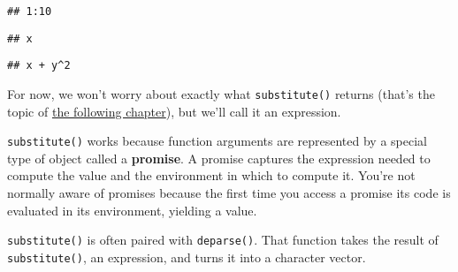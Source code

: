\begin{Shaded}
\begin{Highlighting}[]
\StringTok{ }
\NormalTok{\}}
\NormalTok{(}\OperatorTok{:}\NormalTok{)}
\end{Highlighting}
\end{Shaded}

\begin{verbatim}
## 1:10
\end{verbatim}

\begin{Shaded}
\begin{Highlighting}[]
\StringTok{ }
\end{Highlighting}
\end{Shaded}

\begin{verbatim}
## x
\end{verbatim}

\begin{Shaded}
\begin{Highlighting}[]
\StringTok{ }
\OperatorTok{+}\StringTok{ }\OperatorTok{^}\NormalTok{)}
\end{Highlighting}
\end{Shaded}

\begin{verbatim}
## x + y^2
\end{verbatim}

For now, we won't worry about exactly what \texttt{substitute()} returns
(that's the topic of \protect\hyperlink{metaprogramming}{the following
chapter}), but we'll call it an expression.

\texttt{substitute()} works because function arguments are represented
by a special type of object called a \textbf{promise}. A promise
captures the expression needed to compute the value and the environment
in which to compute it. You're not normally aware of promises because
the first time you access a promise its code is evaluated in its
environment, yielding a value. 

\texttt{substitute()} is often paired with \texttt{deparse()}. That
function takes the result of \texttt{substitute()}, an expression, and
turns it into a character vector. 

